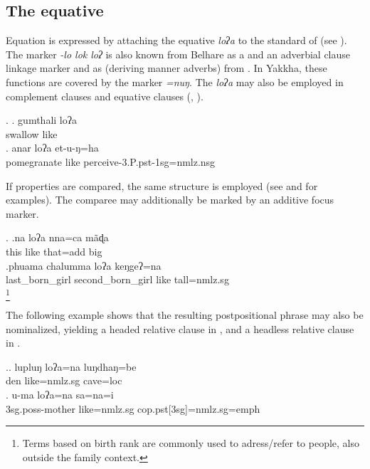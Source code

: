 \subsection{The equative}\label{sec-equ}

Equation is expressed by attaching the equative  \emph{loʔa}  to the standard of  (see \Next). The marker \emph{-lo \ti lok \ti loʔ} is also known from Belhare as a  and an adverbial clause linkage marker \citep{Bickel1993Belhare} and as  (deriving manner adverbs) from   \citep[299]{Doornenbal2009A-grammar}. In Yakkha, these functions are covered by the  marker \emph{=nuŋ}. The  \emph{loʔa}  may also be employed in complement clauses and equative clauses (, ). 

 \ex. \ag. gumthali loʔa\\ 
 swallow like\\
  \bg. anar loʔa et-u-ŋ=ha\\ 
  pomegranate like perceive-{\sc 3.P.pst-1sg=nmlz.nsg}\\
   
  
If properties are compared, the same structure is employed (see \Next and  for examples). The comparee may additionally be marked by an additive focus marker.
  
  \ex. \ag.na loʔa nna=ca mãɖa\\
this like that{\sc =add} big\\
  \bg.phuama chalumma loʔa keŋgeʔ=na\\
  last\_born\_girl  second\_born\_girl  like tall{\sc =nmlz.sg}\\
  \footnote{Terms based on birth rank are commonly used to adress/refer to people, also outside the family context.}

 The following example shows that the resulting postpositional phrase may also be nominalized, yielding a headed relative clause in \Next[a], and a headless relative clause in \Next[b]. 
 
  \ex.\ag. lupluŋ loʔa=na       luŋdhaŋ=be\\
  den like{\sc =nmlz.sg} cave{\sc =loc}\\
   
\bg.  u-ma              loʔa=na        sa=na=i\\
{\sc 3sg.poss-}mother like{\sc =nmlz.sg} {\sc cop.pst[3sg]=nmlz.sg=emph}\\
 


